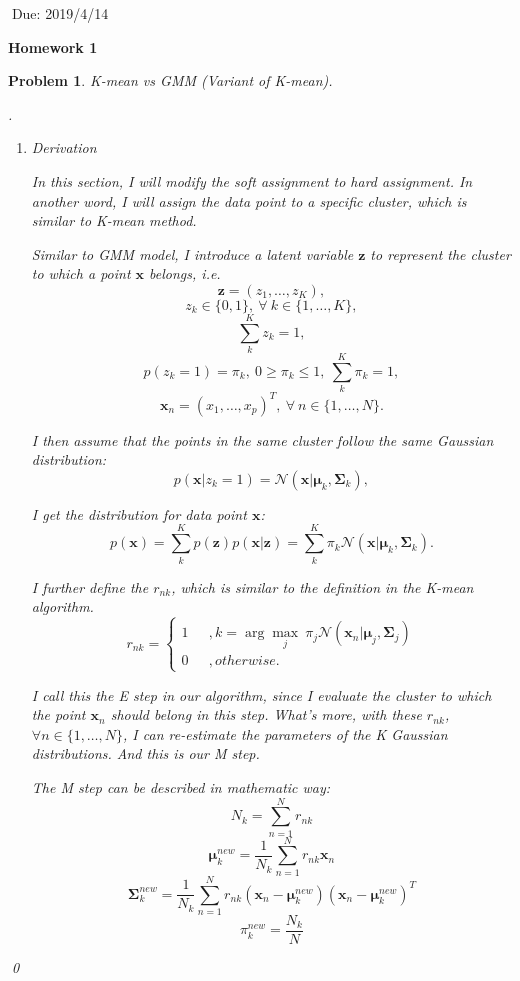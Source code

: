 \documentclass[12pt]{article}
\newtheorem{hw}{Problem}
\newenvironment{sol}
  {\par\vspace{3mm}\noindent{\it Solution}.}
  {\qed}
\newcommand{\argmax}{\arg\!\max}
\newcommand{\xv}{\boldsymbol{x}}
\newcommand{\zv}{\boldsymbol{z}}
\newcommand{\Sigmamat}{\boldsymbol{\Sigma}}
\newcommand{\muv}{\boldsymbol{\mu}}
\newcommand{\ie}{{\em i.e.}}
\begin{document}
$\;$\hfill Due: 2019/4/14

\begin{center}
{\LARGE\bf Homework 1}
\end{center}


\begin{hw}
K-mean vs GMM (Variant of K-mean).
\begin{sol}
	\begin{enumerate}
		\item[(1)]{
			Derivation	
			
			In this section, I will modify the soft assignment to hard assignment. In another word, I will assign the data point to a specific cluster, which is similar to K-mean method.  
			
			Similar to GMM model, I introduce a latent variable $\zv$ to represent the cluster to which a point $\xv$ belongs, \ie 
			$$\zv = (z_1,\ldots,z_K),$$
			$$z_k\in\{0,1\},~\forall~k\in\{1,\ldots,K\},$$
			$$\sum_{k}^{K}z_k = 1,$$
			$$p(z_k=1) = \pi_k,~0\ge\pi_k\le1,~\sum_{k}^{K}\pi_k = 1,$$
			$$\xv_n = (x_1,\ldots,x_p)^T,~\forall~n\in\{1,\ldots,N\}.$$
			
			I then assume that the points in the same cluster follow the same Gaussian distribution:
			$$p(\xv|z_k=1) = \mathcal{N}(\xv|\muv_k,\Sigmamat_k),$$
			
			I get the distribution for data point $\xv$:
			$$p(\xv) = \sum_{k}^{K}p(\zv)p(\xv|\zv) = \sum_{k}^{K}\pi_k\mathcal{N}(\xv|\muv_k,\Sigmamat_k).$$
		
			I further define the $r_{nk}$, which is similar to the definition in the K-mean algorithm.
			$$
				r_{nk} = \left\{
					\begin{aligned}
					1&~~~,k=\argmax_j~\pi_j\mathcal{N}(\xv_n|\muv_j,\Sigmamat_j)\\
					0&~~~,otherwise.
					\end{aligned}
				\right.
			$$
			
			I call this the E step in our algorithm, since I evaluate the cluster to which the point $\xv_n$ should belong in this step. What's more, with these $r_{nk}$,  $\forall n\in\{1,\ldots,N\}$, I can re-estimate the parameters of the K Gaussian distributions. And this is our M step.
			
			The M step can be described in mathematic way:
			$$N_k = \sum_{n=1}^{N} r_{nk}$$
			$$\muv_k^{new} = \frac{1}{N_k}\sum_{n=1}^{N}r_{nk}\xv_n$$
			$$\Sigmamat_k^{new} = \frac{1}{N_k}\sum_{n=1}^{N}r_{nk}(\xv_n-\muv_k^{new})(\xv_n-\muv_k^{new})^{T}$$
			$$\pi_k^{new} = \frac{N_k}{N}$$
				
}
\end{enumerate}
\end{sol}
\end{hw}
\end{document}
